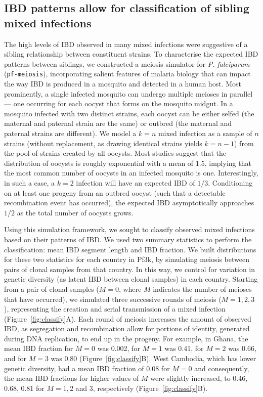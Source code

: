 \documentclass[9pt,lineno]{elife}
\begin{document}
\subsection{IBD patterns allow for classification of sibling mixed infections}


The high levels of IBD observed in many mixed infections were suggestive of a sibling relationship between constituent strains. To characterise the expected IBD patterns between siblings, we constructed a meiosis simulator for {\it P. falciparum} ({\tt pf-meiosis}), incorporating salient features of malaria biology that can impact the way IBD is produced in a mosquito and detected in a human host. Most prominently, a single infected mosquito can undergo multiple meioses in parallel --- one occurring for each oocyst that forms on the mosquito midgut.  In a mosquito infected with two distinct strains, each oocyst can be either selfed (the maternal and paternal strain are the same) or outbred (the maternal and paternal strains are different). We model a $k=n$ mixed infection as a sample of $n$ strains (without replacement, as drawing identical strains yields $k=n-1$) from the pool of strains created by all oocysts. Most studies suggest that the distribution of oocysts is roughly exponential with a mean of 1.5, implying that the most common number of oocysts in an infected mosquito is one. Interestingly, in such a case, a $k=2$ infection will have an expected IBD of $1/3$. Conditioning on at least one progeny from an outbred oocyst (such that a detectable recombination event has occurred), the expected IBD asymptotically approaches $1/2$ as the total number of oocysts grows.

Using this simulation framework, we sought to classify observed mixed infections based on their patterns of IBD. We used two summary statistics to perform the classification: mean IBD segment length and IBD fraction. We built distributions for these two statistics for each country in Pf3k, by simulating meiosis between pairs of clonal samples from that country.  In this way, we control for variation in genetic diversity (as latent IBD between clonal samples) in each country. Starting from a pair of clonal samples ($M=0$, where $M$ indicates the number of meioses that have occurred), we simulated three successive rounds of meiosis ($M=1, 2, 3$), representing the creation and serial transmission of a mixed infection (Figure~\ref{fig:classify}A). Each round of meiosis increases the amount of observed IBD, as segregation and recombination allow for portions of identity, generated during DNA replication, to end up in the progeny. For example, in Ghana, the mean IBD fraction for $M=0$ was 0.002, for $M=1$ was 0.41, for $M=2$ was 0.66, and for $M=3$ was 0.80 (Figure~\ref{fig:classify}B). West Cambodia, which has lower genetic diversity, had a mean IBD fraction of 0.08 for $M=0$ and consequently, the mean IBD fractions for higher values of $M$ were slightly increased, to 0.46, 0.68, 0.81 for $M=1, 2$ and $3$, respectively (Figure~\ref{fig:classify}B).
\end{document}
